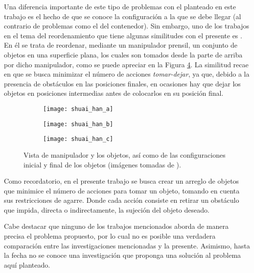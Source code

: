 Una diferencia importante de este tipo de problemas con el planteado en este trabajo es el hecho de que se conoce la configuración a la que se debe llegar (al contrario de problemas como el del contenedor).
Sin embargo, uno de los trabajos en el tema del reordenamiento que tiene algunas similitudes con el presente es \cite{Han-RSS-17}.
En él se trata de reordenar, mediante un manipulador prensil, un conjunto de objetos en una superficie plana, los cuales son tomados desde la parte de arriba por dicho manipulador, como se puede apreciar en la Figura \ref{fig:Han-RSS-17}. 
La similitud recae en que se busca minimizar el número de acciones \textsl{tomar-dejar}, ya que, debido a la presencia de obstáculos en las posiciones finales, en ocasiones hay que dejar los objetos en posiciones intermedias antes de colocarlos en su posición final.
%
\begin{figure}[H]
	\begin{subfigure}{0.1978\linewidth}
		\texttt{[image: shuai\_han\_a]}%
		\subcaption{}%
		\label{subfig:manipulator_objects}%
	\end{subfigure}%
	\hfill%
	\begin{subfigure}{0.3783\linewidth}
		\texttt{[image: shuai\_han\_b]}%
		\subcaption{}%
		\label{subfig:initial_arrangement}%
	\end{subfigure}%
	\hfill%
	\begin{subfigure}{0.3941\linewidth}
		\texttt{[image: shuai\_han\_c]}%
		\subcaption{}%
		\label{subfig:final_arrangement}%
	\end{subfigure}%
	\caption{Vista de  manipulador y los objetos, así como de las configuraciones  inicial y  final de los objetos (imágenes tomadas de \cite{Han-RSS-17}).}%
	\label{fig:Han-RSS-17}%
\end{figure}
%
Como recordatorio, en el presente trabajo se busca crear un arreglo de objetos que minimice el número de acciones para tomar un objeto, tomando en cuenta sus restricciones de agarre. 
Donde cada acción consiste en retirar un obstáculo que impida, directa o indirectamente, la sujeción del objeto deseado.

Cabe destacar que ninguno de los trabajos mencionados aborda de manera precisa el problema propuesto, por lo cual no es posible una verdadera comparación entre las investigaciones mencionadas y la presente.
Asimismo, hasta la fecha no se conoce una investigación que proponga una solución al problema aquí planteado.